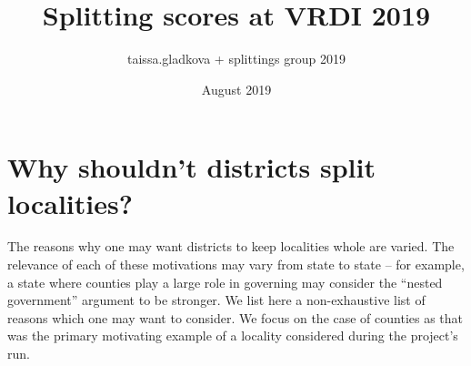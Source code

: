 \documentclass{mgggarticle}
\title{Splitting scores at VRDI 2019}
\author{taissa.gladkova + splittings group 2019}
\date{August 2019}
\begin{document}
\maketitle
\tableofcontents

\section{Why shouldn't districts split localities?}
The reasons why one may want districts to keep localities whole are varied. The relevance of each of these motivations may vary from state to state -- for example, a state where counties play a large role in governing may consider the ``nested government'' argument to be stronger. We list here a non-exhaustive list of reasons which one may want to consider. We focus on the case of counties as that was the primary motivating example of a locality considered during the project's run.
\end{document}
